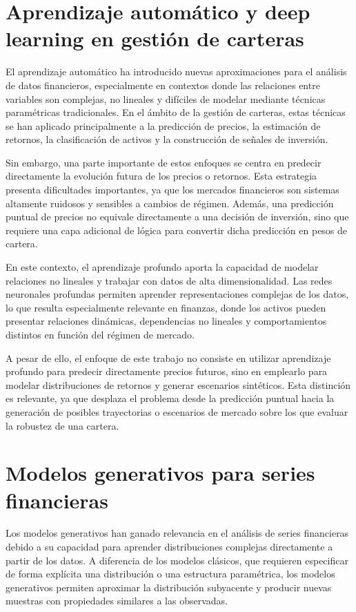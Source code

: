\section{Aprendizaje automático y deep learning en gestión de carteras}

El aprendizaje automático ha introducido nuevas aproximaciones para el análisis de datos financieros, especialmente en contextos donde las relaciones entre variables son complejas, no lineales y difíciles de modelar mediante técnicas paramétricas tradicionales. En el ámbito de la gestión de carteras, estas técnicas se han aplicado principalmente a la predicción de precios, la estimación de retornos, la clasificación de activos y la construcción de señales de inversión.

Sin embargo, una parte importante de estos enfoques se centra en predecir directamente la evolución futura de los precios o retornos. Esta estrategia presenta dificultades importantes, ya que los mercados financieros son sistemas altamente ruidosos y sensibles a cambios de régimen. Además, una predicción puntual de precios no equivale directamente a una decisión de inversión, sino que requiere una capa adicional de lógica para convertir dicha predicción en pesos de cartera.

En este contexto, el aprendizaje profundo aporta la capacidad de modelar relaciones no lineales y trabajar con datos de alta dimensionalidad. Las redes neuronales profundas permiten aprender representaciones complejas de los datos, lo que resulta especialmente relevante en finanzas, donde los activos pueden presentar relaciones dinámicas, dependencias no lineales y comportamientos distintos en función del régimen de mercado.

A pesar de ello, el enfoque de este trabajo no consiste en utilizar aprendizaje profundo para predecir directamente precios futuros, sino en emplearlo para modelar distribuciones de retornos y generar escenarios sintéticos. Esta distinción es relevante, ya que desplaza el problema desde la predicción puntual hacia la generación de posibles trayectorias o escenarios de mercado sobre los que evaluar la robustez de una cartera.

\section{Modelos generativos para series financieras}

Los modelos generativos han ganado relevancia en el análisis de series financieras debido a su capacidad para aprender distribuciones complejas directamente a partir de los datos. A diferencia de los modelos clásicos, que requieren especificar de forma explícita una distribución o una estructura paramétrica, los modelos generativos permiten aproximar la distribución subyacente y producir nuevas muestras con propiedades similares a las observadas.


